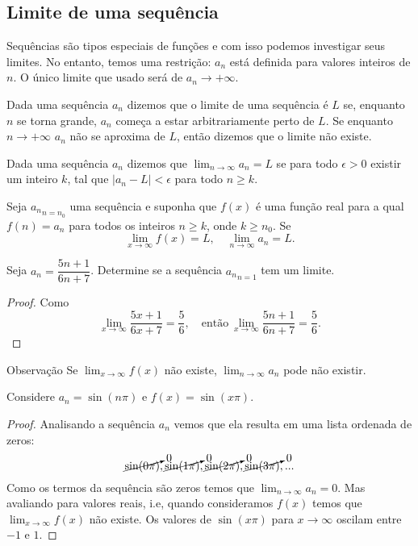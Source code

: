    \subsection{Limite de uma sequência}
      Sequências são tipos especiais de funções e com isso podemos 
      investigar seus limites. No entanto, temos uma restrição: 
      ${a_{n}}$ está definida para valores inteiros de $n$. 
      O único limite que usado será de $a_{n} \to +\infty.$
      \begin{definition}[Intuitiva]
         Dada uma sequência ${a_{n}}$ dizemos que o limite de uma sequência é
         $L$ se, enquanto $n$ se torna grande, $a_{n}$ começa a estar
         arbitrariamente perto de $L$. Se enquanto 
         $n \to +\infty$ $a_{n}$ não
         se aproxima de $L$, então dizemos que o limite não existe.
      \end{definition}
      \begin{definition}
         Dada uma sequência ${a_{n}}$ dizemos que 
         $\lim_{n\to\infty} a_{n} = L$ se para todo 
         $\epsilon > 0$ existir um inteiro $k$, tal que $| a_{n} -
         L | < \epsilon$ para todo $n \geq k$.
      \end{definition}
      \begin{theorem}
         Seja ${a_{n}}_{n=n_{0}}$ uma sequência e suponha que $f(x)$ é uma
         função real para a qual $f(n) = a_{n}$ para todos os inteiros $n \geq k$,
         onde $k \geq n_{0}$. Se $$\lim_{x\to\infty} f(x) = L,\quad
         \lim_{n\to\infty} a_{n} = L.$$
      \end{theorem}
      \begin{exmp}
         Seja $a_{n} = \dfrac{5n+1}{6n+7}$. Determine se a sequência
         ${a_{n}}_{n=1}$ tem um limite.
         \begin{proof}
            Como $$\lim_{x\to\infty} \dfrac{5x+1}{6x+7} = 
            \dfrac{5}{6},\quad \textrm{então}\ \lim_{x\to\infty} 
            \dfrac{5n+1}{6n+7} = \dfrac{5}{6}.$$
         \end{proof}
      \end{exmp}
      \begin{mymdframed}{Observação}
         Se $\lim_{x\to\infty} f(x)$ não existe, 
         $\lim_{n\to\infty} a_{n}$ pode não existir.
      \end{mymdframed}
      \begin{exmp}
         Considere $a_{n} = \sin(n\pi)$ e $f(x) = \sin(x\pi)$.
         \begin{proof}
            Analisando a sequência $a_{n}$ vemos que ela 
            resulta em uma lista ordenada de zeros:
            $$\cancelto{0}{\sin(0\pi)}, \cancelto{0}{\sin(1\pi)}, 
            \cancelto{0}{\sin(2\pi)}, \cancelto{0}{\sin(3\pi)}, ...$$
            Como os termos da sequência são zeros temos que 
            $\lim_{n\to\infty} a_{n} = 0.$ Mas avaliando para 
            valores reais, i.e, quando consideramos $f(x)$ temos 
            que $\lim_{x\to\infty} f(x)$ não existe.
            Os valores de $\sin(x\pi)$ para $x\to\infty$ 
            oscilam entre $-1$ e $1$.
         \end{proof}
      \end{exmp}
